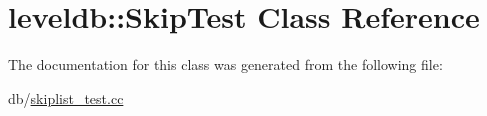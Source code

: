 \hypertarget{classleveldb_1_1_skip_test}{\section{leveldb\-:\-:Skip\-Test Class Reference}
\label{classleveldb_1_1_skip_test}
}


The documentation for this class was generated from the following file\-:\begin{DoxyCompactItemize}
\item 
db/\hyperlink{skiplist__test_8cc}{skiplist\-\_\-test.\-cc}\end{DoxyCompactItemize}
